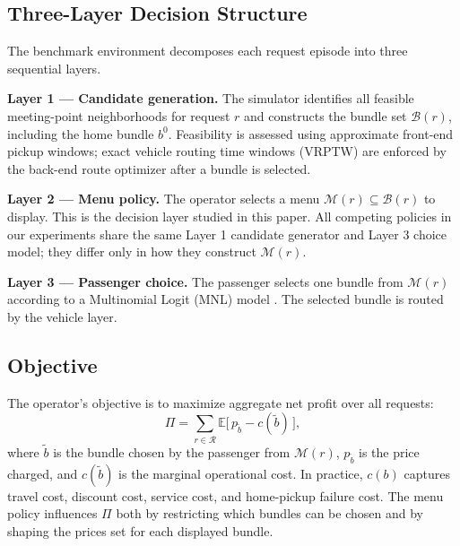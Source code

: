 \subsection{Three-Layer Decision Structure}

The benchmark environment decomposes each request episode into three sequential layers.

\textbf{Layer 1 --- Candidate generation.} The simulator identifies all feasible meeting-point neighborhoods for request $r$ and constructs the bundle set $\mathcal{B}(r)$, including the home bundle $b^0$. Feasibility is assessed using approximate front-end pickup windows; exact vehicle routing time windows (VRPTW) are enforced by the back-end route optimizer \citep{vidal2022hybrid} after a bundle is selected.

\textbf{Layer 2 --- Menu policy.} The operator selects a menu $\mathcal{M}(r) \subseteq \mathcal{B}(r)$ to display. This is the decision layer studied in this paper. All competing policies in our experiments share the same Layer 1 candidate generator and Layer 3 choice model; they differ only in how they construct $\mathcal{M}(r)$.

\textbf{Layer 3 --- Passenger choice.} The passenger selects one bundle from $\mathcal{M}(r)$ according to a Multinomial Logit (MNL) model \citep{ben1985discrete,mcfadden1974conditional}. The selected bundle is routed by the vehicle layer.

\subsection{Objective}

The operator's objective is to maximize aggregate net profit over all requests:
\[
  \Pi = \sum_{r \in \mathcal{R}} \mathbb{E}\bigl[\, p_{\tilde{b}} - c(\tilde{b}) \,\bigr],
\]
where $\tilde{b}$ is the bundle chosen by the passenger from $\mathcal{M}(r)$, $p_{\tilde{b}}$ is the price charged, and $c(\tilde{b})$ is the marginal operational cost. In practice, $c(b)$ captures travel cost, discount cost, service cost, and home-pickup failure cost. The menu policy influences $\Pi$ both by restricting which bundles can be chosen and by shaping the prices set for each displayed bundle.
